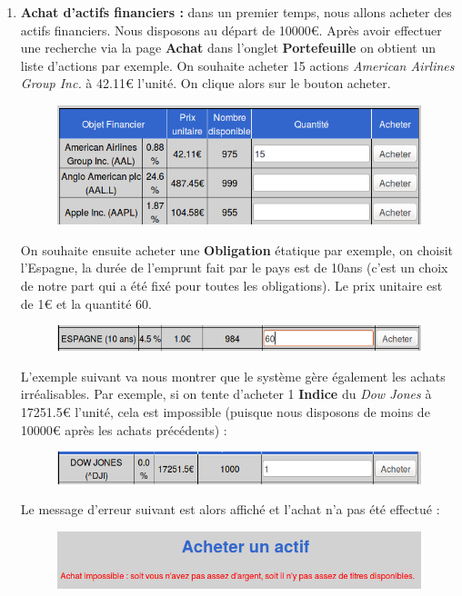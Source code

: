       \begin{enumerate}
       \item \textbf{Achat d'actifs financiers :} dans un premier temps, nous allons acheter des actifs financiers. Nous disposons au départ de 10000€. Après avoir effectuer une recherche via la page \textbf{Achat} dans l'onglet \textbf{Portefeuille} on obtient un liste d'actions par exemple. On souhaite acheter 15 actions \textit{American Airlines Group Inc.} à 42.11€ l'unité. On clique alors sur le bouton acheter.
      \begin{figure}[H]
	\center
	\includegraphics[scale=0.5]{../graph/7-achataction.png}
      \end{figure}

      On souhaite ensuite acheter une \textbf{Obligation} étatique par exemple, on choisit l'Espagne, la durée de l'emprunt fait par le pays est de 10ans (c'est un choix de notre part qui a été fixé pour toutes les obligations). Le prix unitaire est de 1€ et la quantité 60.
      \begin{figure}[H]
	\center
	\includegraphics[scale=0.5]{../graph/7-achatobligation.png}
      \end{figure}
      
      L'exemple suivant va nous montrer que le système gère également les achats irréalisables. Par exemple, si on tente d'acheter 1 \textbf{Indice} du \textit{Dow Jones} à 17251.5€ l'unité, cela est impossible (puisque nous disposons de moins de 10000€ après les achats précédents) :
      \begin{figure}[H]
	\center
	\includegraphics[scale=0.5]{../graph/7-achatindicetropcher.png}
      \end{figure}
      
      Le message d'erreur suivant est alors affiché et l'achat n'a pas été effectué :
      \begin{figure}[H]
	\center
	\includegraphics[scale=0.5]{../graph/7-achatindiceechec.png}
      \end{figure}
     

\end{enumerate}
